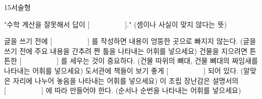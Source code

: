 \documentclass[fs11,seriesFre]{korfarm-base}
\begin{document}
\begin{kfQBlock}{15}{서술형}
\begin{kfEvidence}"수학 계산을 잘못해서 답이 [　　　　　]." (셈이나 사실이 맞지 않다는 뜻)\end{kfEvidence}
\end{kfQBlock}




\clearpage

\begin{kfChapterAreaList}
\end{kfChapterAreaList}



\kfActivityBg \par{}\par\nopagebreak[4]\smallskip\nopagebreak[4]
\begin{kfBlankList}
\kfBlankItem 글을 쓰기 전에 [　　　　　] 를 작성하면 내용이 엉뚱한 곳으로 빠지지 않는다. (글을 쓰기 전에 주요 내용을 간추려 짠 틀을 나타내는 어휘를 넣으세요)
\kfBlankItem 건물을 지으려면 튼튼한 [　　　　　] 를 세우는 것이 중요하다. (건물 따위의 뼈대, 건물 뼈대의 짜임새를 나타내는 어휘를 넣으세요)
\kfBlankItem 도서관에 책들이 보기 좋게 [　　　　　] 되어 있다. (알맞은 자리에 나누어 놓음을 나타내는 어휘를 넣으세요)
\kfBlankItem 이 조립 장난감은 설명서의 [　　　　　] 에 따라 만들어야 한다. (순서나 순번을 나타내는 어휘를 넣으세요)
\end{kfBlankList}

\end{document}
